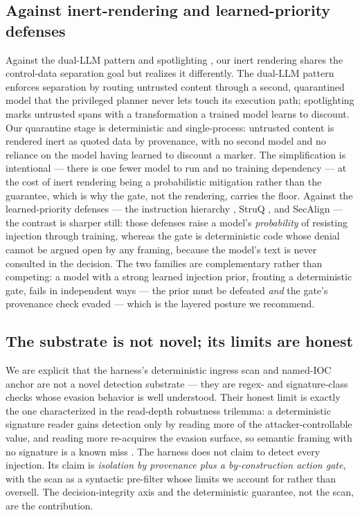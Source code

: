 \documentclass[sigconf,anonymous,review]{acmart}
\begin{document}
\subsection{Against inert-rendering and learned-priority defenses}
Against the dual-LLM pattern \citep{willison-2023-dualllm} and spotlighting \citep{hines-2024-spotlighting}, our inert rendering shares the control-data separation goal but realizes it differently. The dual-LLM pattern enforces separation by routing untrusted content through a second, quarantined model that the privileged planner never lets touch its execution path; spotlighting marks untrusted spans with a transformation a trained model learns to discount. Our quarantine stage is deterministic and single-process: untrusted content is rendered inert as quoted data by provenance, with no second model and no reliance on the model having learned to discount a marker. The simplification is intentional --- there is one fewer model to run and no training dependency --- at the cost of inert rendering being a probabilistic mitigation rather than the guarantee, which is why the gate, not the rendering, carries the floor. Against the learned-priority defenses --- the instruction hierarchy \citep{wallace-2024-instruction-hierarchy}, StruQ \citep{chen-2024-struq}, and SecAlign \citep{chen-2024-secalign} --- the contrast is sharper still: those defenses raise a model's \textit{probability} of resisting injection through training, whereas the gate is deterministic code whose denial cannot be argued open by any framing, because the model's text is never consulted in the decision. The two families are complementary rather than competing: a model with a strong learned injection prior, fronting a deterministic gate, fails in independent ways --- the prior must be defeated \textit{and} the gate's provenance check evaded --- which is the layered posture we recommend.


\subsection{The substrate is not novel; its limits are honest}
We are explicit that the harness's deterministic ingress scan and named-IOC anchor are not a novel detection substrate --- they are regex- and signature-class checks whose evasion behavior is well understood. Their honest limit is exactly the one characterized in the read-depth robustness trilemma: a deterministic signature reader gains detection only by reading more of the attacker-controllable value, and reading more re-acquires the evasion surface, so semantic framing with no signature is a known miss \citep{gmys-casiano-2026d}. The harness does not claim to detect every injection. Its claim is \textit{isolation by provenance plus a by-construction action gate}, with the scan as a syntactic pre-filter whose limits we account for rather than oversell. The decision-integrity axis and the deterministic guarantee, not the scan, are the contribution.
\end{document}
